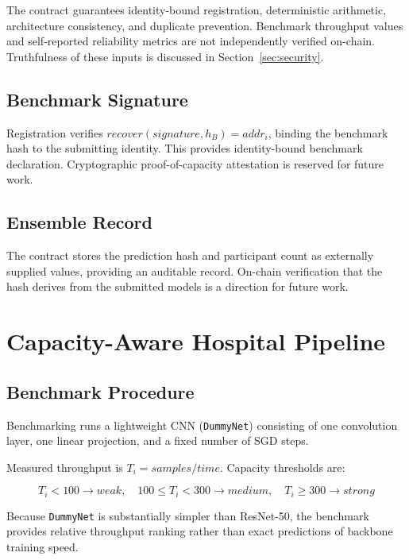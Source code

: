 \documentclass[conference]{IEEEtran}
\begin{document}
The contract guarantees identity-bound registration, deterministic arithmetic, architecture consistency, and duplicate prevention. Benchmark throughput values and self-reported reliability metrics are not independently verified on-chain. Truthfulness of these inputs is discussed in Section~\ref{sec:security}.

\subsection{Benchmark Signature}

Registration verifies $recover(signature,h_B)=addr_i$, binding the benchmark hash to the submitting identity. This provides identity-bound benchmark declaration. Cryptographic proof-of-capacity attestation is reserved for future work.

\subsection{Ensemble Record}

The contract stores the prediction hash and participant count as externally supplied values, providing an auditable record. On-chain verification that the hash derives from the submitted models is a direction for future work.

\section{Capacity-Aware Hospital Pipeline}

\subsection{Benchmark Procedure}

Benchmarking runs a lightweight CNN (\texttt{DummyNet}) consisting of one convolution layer, one linear projection, and a fixed number of SGD steps.

Measured throughput is $T_i = samples/time$. Capacity thresholds are:

\begin{equation}
T_i<100 \rightarrow weak, \quad 100 \leq T_i < 300 \rightarrow medium, \quad T_i \geq 300 \rightarrow strong
\end{equation}

Because \texttt{DummyNet} is substantially simpler than ResNet-50, the benchmark provides relative throughput ranking rather than exact predictions of backbone training speed.
\end{document}
